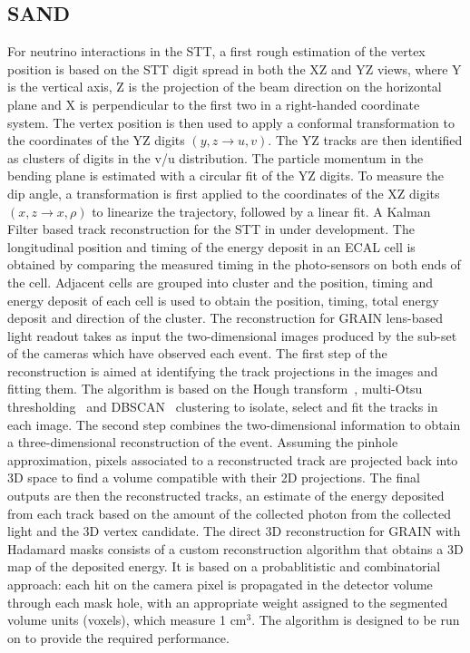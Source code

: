 \documentclass[../main-v1.tex]{subfiles}
\begin{document}
\subsection{SAND}

For neutrino interactions in the STT, a first rough estimation of the vertex position is based on the STT digit spread in both the XZ and YZ views, where Y is the vertical axis, Z is the projection of the beam direction on the horizontal plane and X is perpendicular to the first two in a right-handed coordinate system. The vertex position is then used to apply a conformal transformation to the coordinates of the YZ digits $(y,z \rightarrow u,v)$. The YZ tracks are then identified as clusters of digits in the v/u distribution. The particle momentum in the bending plane is estimated with a circular fit of the YZ digits. To measure the dip angle, a transformation is first applied to the coordinates of the XZ digits $(x,z \rightarrow x,\rho)$ to linearize the trajectory, followed by a linear fit. A Kalman Filter based track reconstruction for the STT in under development.
The longitudinal position and timing of the energy deposit in an ECAL cell is obtained by comparing the measured timing in the photo-sensors on both ends of the cell. Adjacent cells are grouped into cluster and the position, timing and energy deposit of each cell is used to obtain the position, timing, total energy deposit and direction of the cluster.
The reconstruction for GRAIN lens-based light readout takes as input the two-dimensional images produced by the sub-set of the cameras which have observed each event. The first step of the reconstruction is aimed at identifying the track projections in the images and fitting them. The algorithm is based on the Hough transform~\cite{Hough:1959qva}, multi-Otsu thresholding~\cite{1979:ots} and DBSCAN~\cite{Ester96adensity-based} clustering to isolate, select and fit the tracks in each image. The second step combines the two-dimensional information to obtain a three-dimensional reconstruction of the event. Assuming the pinhole approximation, pixels associated to a reconstructed track are projected back into 3D space to find a volume compatible with their 2D projections. The final outputs are then the reconstructed tracks, an estimate of the energy deposited from each track based on the amount of the collected photon from the collected light and the 3D vertex candidate.
The direct 3D reconstruction for GRAIN with Hadamard masks consists of a custom reconstruction algorithm that obtains a 3D map of the deposited energy. It is based on a probablitistic and combinatorial approach: each hit on the camera pixel is propagated in the detector volume through each mask hole, with an appropriate weight assigned to the segmented volume units (voxels), which measure 1 cm$^3$.  The algorithm is designed to be run on  to provide the required performance.
\end{document}
